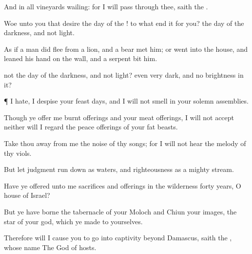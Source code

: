 {And in all
vineyards
{}
wailing: for I will
pass
through thee,
saith the
{}.

Woe unto you that
desire the
day of the
{}! to what
end
{} it for you? the
day of the
{}
{}
darkness, and not
light.

As if a
man did
flee
from a
lion, and a
bear
met him; or
went into the
house, and
leaned his
hand on the
wall, and a
serpent
bit him.

 not the
day of the
{}
{}
darkness, and not
light? even very
dark, and no
brightness in it?


\par }{\PP {}¶ I
hate, I
despise your feast
days, and I will not
smell in your solemn
assemblies.

Though ye
offer me burnt
offerings and your meat
offerings, I will not
accept
{} neither will I
regard the peace
offerings of your fat
beasts.

Take thou
away from me the
noise of thy
songs; for I will not
hear the
melody of thy
viols.

But let
judgment run
down as
waters, and
righteousness as a
mighty
stream.

Have ye
offered unto me
sacrifices and
offerings in the
wilderness
forty
years, O
house of
Israel?

But ye have
borne the
tabernacle of your
Moloch and
Chiun your
images, the
star of your
god, which ye
made to yourselves.

Therefore will I cause you to go into
captivity
beyond
Damascus,
saith the
{}, whose
name
{} The
God of
hosts.




\par }
